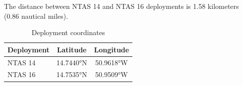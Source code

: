 
The distance between NTAS 14 and NTAS 16 deployments is 1.58 kilometers (0.86 nautical miles).

\begin{table}[ht]
\centering
\caption{Deployment coordinates}
\begin{tabular}{lcc}
\hline
\textbf{Deployment} & \textbf{Latitude} & \textbf{Longitude} \\
\hline
NTAS 14 & 14.7440°N & 50.9618°W \\
NTAS 16 & 14.7535°N & 50.9509°W \\
\hline
\end{tabular}
\end{table}
